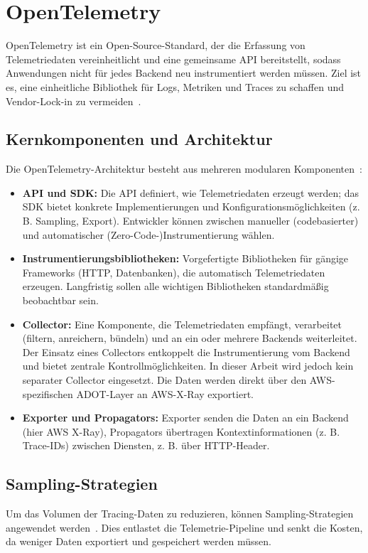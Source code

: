 \section{OpenTelemetry}
\label{sec:otel}
OpenTelemetry ist ein Open-Source-Standard, der die Erfassung von Telemetriedaten vereinheitlicht und eine gemeinsame API bereitstellt, 
sodass Anwendungen nicht für jedes Backend neu instrumentiert werden müssen. Ziel ist es, eine einheitliche Bibliothek für Logs, 
Metriken und Traces zu schaffen und Vendor-Lock-in zu vermeiden~\cite{OpenTelemetryInstrumentation,OpenTelemetryWhatIs}.


\subsection{Kernkomponenten und Architektur}
Die OpenTelemetry-Architektur besteht aus mehreren modularen Komponenten~\cite{OpenTelemetryComponents,OpenTelemetryInstrumentation}:
\begin{itemize}
    \item \textbf{API und SDK:} Die \ac{API} definiert, wie Telemetriedaten erzeugt werden; das \ac{SDK} bietet konkrete Implementierungen und Konfigurationsmöglichkeiten (z. B. Sampling, Export). Entwickler können zwischen manueller (codebasierter) und automatischer (Zero-Code-)Instrumentierung wählen.
    \item \textbf{Instrumentierungsbibliotheken:} Vorgefertigte Bibliotheken für gängige Frameworks (HTTP, Datenbanken), die automatisch Telemetriedaten erzeugen. Langfristig sollen alle wichtigen Bibliotheken standardmäßig beobachtbar sein.
    \item \textbf{Collector:} Eine Komponente, die Telemetriedaten empfängt, verarbeitet (filtern, anreichern, bündeln) und an ein oder mehrere Backends weiterleitet. Der Einsatz eines Collectors entkoppelt die Instrumentierung vom Backend und bietet zentrale Kontrollmöglichkeiten. In dieser Arbeit wird jedoch kein separater Collector eingesetzt. Die Daten werden direkt über den AWS-spezifischen ADOT-Layer an AWS-X-Ray exportiert.
    \item \textbf{Exporter und Propagators:} Exporter senden die Daten an ein Backend (hier AWS X-Ray), Propagators übertragen Kontextinformationen (z. B. Trace-IDs) zwischen Diensten, z. B. über \ac{HTTP}-Header.
\end{itemize}

\subsection{Sampling-Strategien}
\label{subsec:sampling}
Um das Volumen der Tracing-Daten zu reduzieren, können Sampling-Strategien angewendet werden~\cite{OpenTelemetrySampling}. 
Dies entlastet die Telemetrie-Pipeline und senkt die Kosten, da weniger Daten exportiert und gespeichert werden müssen.

